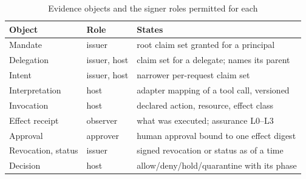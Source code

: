\documentclass[conference]{IEEEtran}
\begin{document}
\begin{table}[t]
\caption{Evidence objects and the signer roles permitted for each}\label{tab:objects}
\centering\footnotesize
\begin{tabular}{@{}p{1.55cm}p{1.35cm}p{5.1cm}@{}}
\toprule
Object & Role & States \\
\midrule
Mandate & issuer & root claim set granted for a principal \\
Delegation & issuer, host & claim set for a delegate; names its parent \\
Intent & issuer, host & narrower per-request claim set \\
Interpretation & host & adapter mapping of a tool call, versioned \\
Invocation & host & declared action, resource, effect class \\
Effect receipt & observer & what was executed; assurance L0--L3 \\
Approval & approver & human approval bound to one effect digest \\
Revocation, status & issuer & signed revocation or status as of a time \\
Decision & host & allow/deny/hold/quarantine with its phase \\
\bottomrule
\end{tabular}
\end{table}
\end{document}
